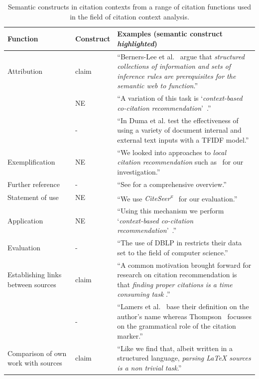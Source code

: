 \begin{table}[]
\centering
    \caption{Semantic constructs in citation contexts from a range of citation functions used in the field of citation context analysis.}
    \label{tab:citfunctions}
\begin{center}
    \begin{tabular}{m{2.7cm}lm{8.5cm}}
    \toprule
    Function & Construct & Examples (semantic construct \emph{highlighted})\\
    \midrule
    Attribution & claim & ``Berners-Lee et al.~\cite{Berners-Lee2001} argue that \emph{structured collections of information and sets of inference rules are prerequisites for the semantic web to function}.'' \\\noalign{\smallskip}
    \  & NE & ``A variation of this task is `\emph{context-based co-citation recommendation}'~\cite{Kobayashi2018}.'' \\\noalign{\smallskip}
    \  & - & ``In \cite{Duma2014} Duma et al. test the effectiveness of using a variety of document internal and external text inputs with a TFIDF model.'' \\\noalign{\medskip}
    Exemplification & NE & ``We looked into approaches to \emph{local citation recommendation} such as~\cite{He2010,Huang2014,Huang2015,Duma2014,Duma2016,Ebesu2017,Kobayashi2018,Jeong2019} for our investigation.'' \\\noalign{\medskip}
    Further reference & - & ``See \cite{Niklaus2018} for a comprehensive overview.'' \\\noalign{\medskip}
    Statement of use & NE & ``We use \emph{CiteSeer\textsuperscript{x}}~\cite{Caragea2014} for our evaluation.'' \\\noalign{\medskip}
    Application & NE & ``Using this mechanism we perform `\emph{context-based co-citation recommendation}'~\cite{Kobayashi2018}.'' \\\noalign{\medskip}
    Evaluation & - & ``The use of DBLP in \cite{Faerber2018} restricts their data set to the field of computer science.'' \\\noalign{\medskip}
    Establishing links between sources& claim & ``A common motivation brought forward for research on citation recommendation is that \emph{finding proper citations is a time consuming task} \cite{He2010,He2011,Ebesu2017,Kobayashi2018}.'' \\\noalign{\smallskip}
    \  & - & ``Lamers et al.~\cite{Lamers2018} base their definition on the author's name whereas Thompson~\cite{Thompson2001} focusses on the grammatical role of the citation marker.'' \\\noalign{\medskip}
    Comparison of own work with sources& claim & ``Like \cite{Faerber2018} we find that, albeit written in a structured language, \emph{parsing \LaTeX{} sources is a non trivial task}.'' \\
    \bottomrule
    \end{tabular}
\end{center}
\end{table}

